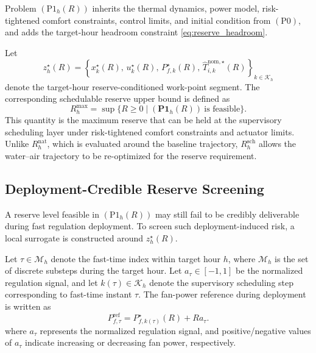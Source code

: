 \documentclass[journal]{IEEEtran}
\theoremstyle{remark}
\begin{document}
Problem \((\mathrm{P1}_h(R))\) inherits the thermal dynamics, power
model, risk-tightened comfort constraints, control limits, and initial
condition from \((\mathrm{P0})\), and adds the target-hour headroom
constraint \eqref{eq:reserve_headroom}. 

Let
\begin{equation}
	z_h^\star(R)
	=
	\left\{
	x_k^\star(R),\,
	u_k^\star(R),\,
	P_{f,k}^\star(R),\,
	\hat T_{i,k}^{\mathrm{nom},\star}(R)
	\right\}_{k\in\mathcal{K}_h}
	\label{eq:work_point}
\end{equation}
denote the target-hour reserve-conditioned work-point segment. The
corresponding schedulable reserve upper bound is defined as
\begin{equation}
    R_h^{\max}
    =
    \sup \{R \ge 0 \mid (\mathbf{P1}_h(R))\ \text{is feasible}\}.
\end{equation}
This quantity is the maximum reserve that can be held at the
supervisory scheduling layer under risk-tightened comfort constraints
and actuator limits. Unlike \(R_h^{\mathrm{nat}}\), which is evaluated
around the baseline trajectory, \(R_h^{\mathrm{sch}}\) allows the
water--air trajectory to be re-optimized for the reserve requirement.

\subsection{Deployment-Credible Reserve Screening}
\label{subsec:credible_screening}
A reserve level feasible in \((\mathrm{P1}_h(R))\) may still fail
to be credibly deliverable during fast regulation deployment.
To screen such deployment-induced risk, a local surrogate is
constructed around \(z_h^\star(R)\).

Let \(\tau\in\mathcal{M}_h\) denote the fast-time index within target hour \(h\), where \(\mathcal{M}_h\) is the set of discrete substeps during the target hour. Let \(a_\tau \in [-1, 1]\) be the normalized regulation signal, and let \(k(\tau) \in \mathcal{K}_h\) denote the supervisory scheduling step corresponding to fast-time instant \(\tau\). The fan-power reference during deployment is written as
\begin{equation}
	P_{f,\tau}^{\mathrm{ref}}
	=
	P_{f,k(\tau)}^\star(R)+R a_\tau .
	\label{eq:fan_ref}
\end{equation}
where \(a_\tau\) represents the normalized regulation signal, and positive/negative values of \(a_\tau\) indicate increasing or decreasing fan power, respectively.
\end{document}
